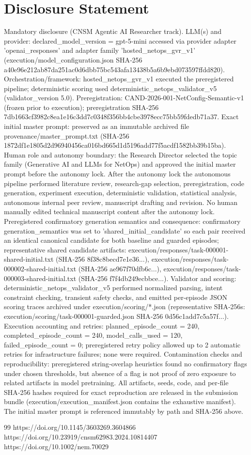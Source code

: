 \documentclass[conference]{IEEEtran}
\begin{document}
\section*{Disclosure Statement}
Mandatory disclosure (CNSM Agentic AI Researcher track). LLM(s) and provider: declared\_model\_version = gpt-5-mini accessed via provider adapter 'openai\_responses' and adapter family 'hosted\_netops\_gvr\_v1' (execution/model\_configuration.json SHA‑256 a40e96e212ab87da251ac0d6dbb75bc543afa13438b5a6b9ebd073597ffdd820). Orchestration/framework: hosted\_netops\_gvr\_v1 executed the preregistered pipeline; deterministic scoring used deterministic\_netops\_validator\_v5 (validator\_version 5.0). Preregistration: CAND-2026-001-NetConfig-Semantic-v1 (frozen prior to execution); preregistration SHA‑256 7db1663cf3982c8ea1e16c3dd7c0348f356bb4cbe3978ecc75bb59fdedb71a37. Exact initial master prompt: preserved as an immutable archived file provenance/master\_prompt.txt (SHA‑256 1872df1e1805d2d96940456ca016bd665d1d5196add77f5acdf1582bb39b15ba). Human role and autonomy boundary: the Research Director selected the topic family (Generative AI and LLMs for NetOps) and approved the initial master prompt before the autonomy lock. After the autonomy lock the autonomous pipeline performed literature review, research‑gap selection, preregistration, code generation, experiment execution, deterministic validation, statistical analysis, autonomous internal peer review, manuscript drafting and revision. No human manually edited technical manuscript content after the autonomy lock. Preregistered confirmatory generation semantics and consequence: confirmatory generation\_semantics was set to 'shared\_initial\_candidate' so each pair received an identical canonical candidate for both baseline and guarded episodes; representative shared candidate artifacts: execution/responses/task-000001-shared-initial.txt (SHA‑256 8f38c8becd7e1e36...), execution/responses/task-000002-shared-initial.txt (SHA‑256 ae967f70dfb6c...), execution/responses/task-000003-shared-initial.txt (SHA‑256 f7f4db249ecbbce...). Validator and scoring: deterministic\_netops\_validator\_v5 performed normalized parsing, intent constraint checking, transient safety checks, and emitted per‑episode JSON scoring traces archived under execution/scoring/*.json (representative SHA‑256s: execution/scoring/task-000001-guarded.json SHA‑256 0d56c1add7c5a57f...). Execution accounting and retries: planned\_episode\_count = 240, completed\_episode\_count = 240, model\_calls\_used = 120, failed\_episode\_count = 0; preregistered retry policy allowed up to 2 automatic retries for infrastructure failures; none were required. Contamination checks and reproducibility: preregistered string‑overlap heuristics found no confirmatory flags under chosen thresholds, but absence of a flag is not proof of zero exposure to related artifacts in model pretraining. All artifacts, seeds, code, and per‑file SHA‑256 hashes required for exact reproduction are released in the submission bundle (execution/execution\_manifest.json contains the exhaustive manifest). The initial master prompt is referenced immutably by path and SHA‑256 above.

\begin{thebibliography}{99}
 https://doi.org/10.1145/3603269.3604866
 https://doi.org/10.23919/cnsm62983.2024.10814407
 https://doi.org/10.1002/nem.70029
\end{thebibliography}
\end{document}
